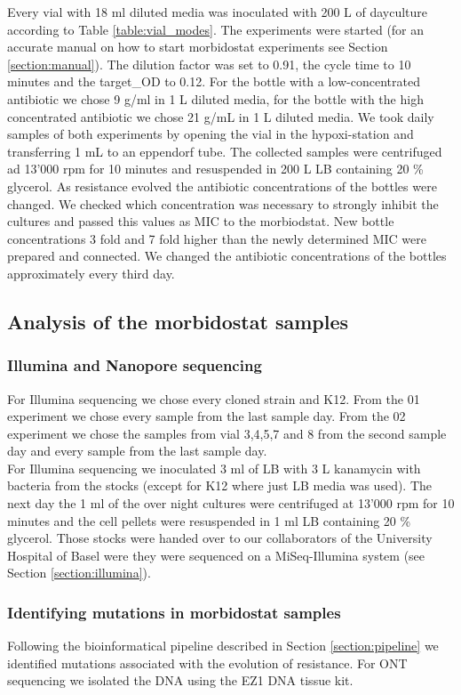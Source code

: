 Every vial with 18 ml diluted media was inoculated with 200 \textmu L of dayculture according to Table \ref{table:vial_modes}. The experiments were started (for an accurate manual on how to start morbidostat experiments see Section \ref{section:manual}). The dilution factor was set to 0.91, the cycle time to 10 minutes and the target\_OD to 0.12. For the bottle with a low-concentrated antibiotic we chose 9 \textmu g/ml in 1 L diluted media, for the bottle with the high concentrated antibiotic we chose 21 \textmu g/mL in 1 L diluted media. We took daily samples of both experiments by opening the vial in the hypoxi-station and transferring 1 mL to an eppendorf tube. The collected samples were centrifuged ad 13'000 rpm for 10 minutes and resuspended in 200 \textmu L LB containing 20 \% glycerol. As resistance evolved the antibiotic concentrations of the bottles were changed. We checked which concentration was necessary to strongly inhibit the cultures and passed this values as MIC to the morbiodstat. New bottle concentrations 3 fold and 7 fold higher than the newly determined MIC were prepared and connected. We changed the antibiotic concentrations of the bottles approximately every third day.\\

\subsection{Analysis of the morbidostat samples}
\subsubsection{Illumina and Nanopore sequencing}
For Illumina sequencing we chose every cloned strain and K12. From the 01 experiment we chose every sample from the last sample day. From the 02 experiment we chose the samples from vial 3,4,5,7 and 8 from the second sample day and every sample from the last sample day. \\
For Illumina sequencing we inoculated 3 ml of LB with 3 \textmu L kanamycin with bacteria from the stocks (except for K12 where just LB media was used). The next day the 1 ml of the over night cultures were centrifuged at 13'000 rpm for 10 minutes and the cell pellets were resuspended in 1 ml LB containing 20 \% glycerol. Those stocks were handed over to our collaborators of the University Hospital of Basel were they were sequenced on a MiSeq-Illumina system (see Section \ref{section:illumina}). \\
\subsubsection{Identifying mutations in morbidostat samples}
Following the bioinformatical pipeline described in Section \ref{section:pipeline} we identified mutations associated with the evolution of resistance. For ONT sequencing we isolated the DNA using the EZ1 DNA tissue kit. 